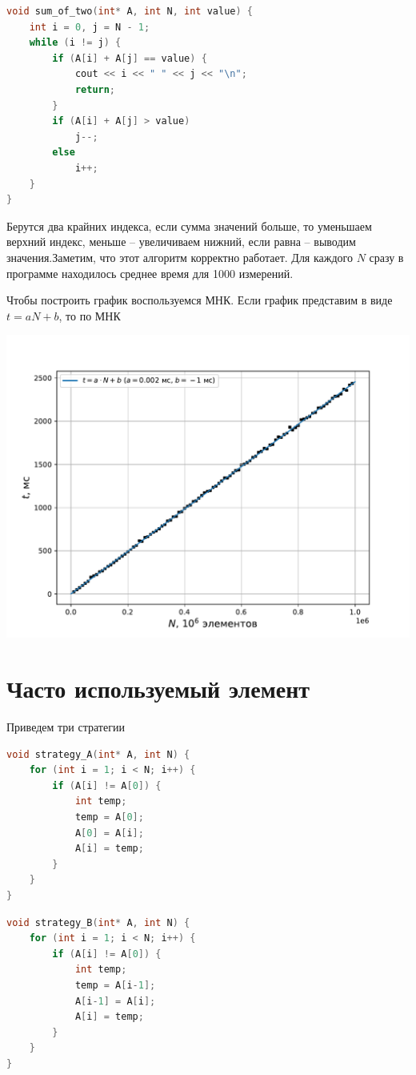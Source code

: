 \documentclass[a4paper,12pt]{article}
\begin{document}
\begin{lstlisting}[language=C++]
void sum_of_two(int* A, int N, int value) {
	int i = 0, j = N - 1;
	while (i != j) {
		if (A[i] + A[j] == value) {
			cout << i << " " << j << "\n";
			return;
		}
		if (A[i] + A[j] > value)
			j--;
		else
			i++;
	}
}
\end{lstlisting}

Берутся два крайних индекса, если сумма значений больше, то уменьшаем верхний индекс, меньше -- увеличиваем нижний, если равна -- выводим значения.Заметим, что этот алгоритм корректно работает. Для каждого $N$ сразу в программе находилось среднее время для 1000 измерений.


Чтобы построить график воспользуемся МНК. Если график представим в виде $t = aN+b$, то по МНК

\begin{center}
\includegraphics[scale=0.8]{Figure_4.pdf}
\end{center}

\section*{Часто используемый элемент}
Приведем три стратегии

\begin{lstlisting}[language=C++]
void strategy_A(int* A, int N) {
	for (int i = 1; i < N; i++) {
		if (A[i] != A[0]) {
			int temp;
			temp = A[0];
			A[0] = A[i];
			A[i] = temp;
		}
	}
}
\end{lstlisting}

\begin{lstlisting}[language=C++]
void strategy_B(int* A, int N) {
	for (int i = 1; i < N; i++) {
		if (A[i] != A[0]) {
			int temp;
			temp = A[i-1];
			A[i-1] = A[i];
			A[i] = temp;
		}
	}
}
\end{lstlisting}
\end{document}
